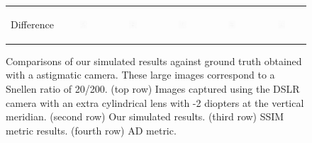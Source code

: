 \begin{figure}[!t]
\begin{tabular}{@{}r@{ } c@{ } c@{ } c@{ } c@{ } c }
	\begin{sideways} \parbox[b]{20mm} {Difference} \end{sideways} &
	\includegraphics[width=0.185\textwidth]{__Images/05/WB_20-200_-2@90/wb_N_20-200_Camera-2,00D@90(diff).png} &
	\includegraphics[width=0.185\textwidth]{__Images/05/WB_20-200_-2@90/wb_C_20-200_Camera-2,00D@90(diff).png} &
	\includegraphics[width=0.185\textwidth]{__Images/05/WB_20-200_-2@90/wb_K_20-200_Camera-2,00D@90(diff).png} &
	\includegraphics[width=0.185\textwidth]{__Images/05/WB_20-200_-2@90/wb_Z_20-200_Camera-2,00D@90(diff).png} &
	\includegraphics[width=0.185\textwidth]{__Images/05/WB_20-200_-2@90/wb_O_20-200_Camera-2,00D@90(diff).png} \\

	\end{tabular}
	
	\caption[Comparisons of our simulated results against ground truth obtained with a astigmatic camera]{Comparisons of our simulated results against ground truth obtained with a astigmatic camera. These large images correspond to a Snellen ratio of 20/200. (top row) Images captured using the DSLR camera with an extra cylindrical lens with -2 diopters at the vertical meridian. (second row) Our simulated results. (third row) SSIM metric results. (fourth row) AD metric.}
	\label{fig:comparison_astig-2@90_wb}
\end{figure}

